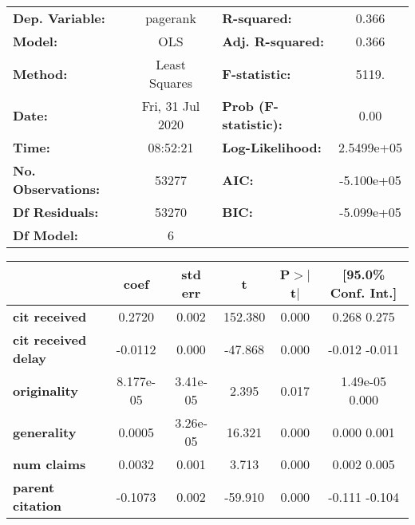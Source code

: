 \begin{center}
\begin{tabular}{lclc}
\toprule
\textbf{Dep. Variable:}     &     pagerank     & \textbf{  R-squared:         } &       0.366    \\
\textbf{Model:}             &       OLS        & \textbf{  Adj. R-squared:    } &       0.366    \\
\textbf{Method:}            &  Least Squares   & \textbf{  F-statistic:       } &       5119.    \\
\textbf{Date:}              & Fri, 31 Jul 2020 & \textbf{  Prob (F-statistic):} &       0.00     \\
\textbf{Time:}              &     08:52:21     & \textbf{  Log-Likelihood:    } &   2.5499e+05   \\
\textbf{No. Observations:}  &       53277      & \textbf{  AIC:               } &   -5.100e+05   \\
\textbf{Df Residuals:}      &       53270      & \textbf{  BIC:               } &   -5.099e+05   \\
\textbf{Df Model:}          &           6      & \textbf{                     } &                \\
\bottomrule
\end{tabular}
\begin{tabular}{lccccc}
                            & \textbf{coef} & \textbf{std err} & \textbf{t} & \textbf{P$>$$|$t$|$} & \textbf{[95.0\% Conf. Int.]}  \\
\midrule
\textbf{cit received}       &       0.2720  &        0.002     &   152.380  &         0.000        &         0.268     0.275       \\
\textbf{cit received delay} &      -0.0112  &        0.000     &   -47.868  &         0.000        &        -0.012    -0.011       \\
\textbf{originality}        &    8.177e-05  &     3.41e-05     &     2.395  &         0.017        &      1.49e-05     0.000       \\
\textbf{generality}         &       0.0005  &     3.26e-05     &    16.321  &         0.000        &         0.000     0.001       \\
\textbf{num claims}         &       0.0032  &        0.001     &     3.713  &         0.000        &         0.002     0.005       \\
\textbf{parent citation}    &      -0.1073  &        0.002     &   -59.910  &         0.000        &        -0.111    -0.104       \\

\end{tabular}
\end{center}

